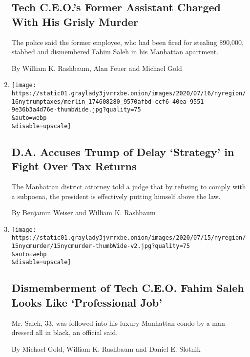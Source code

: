 \begin{enumerate}
{  \subsection{Tech C.E.O.'s Former Assistant Charged With His Grisly
  Murder}\label{tech-ceos-former-assistant-charged-with-his-grisly-murder}}

  The police said the former employee, who had been fired for stealing
  \$90,000, stabbed and dismembered Fahim Saleh in his Manhattan
  apartment.

  By William K. Rashbaum, Alan Feuer and Michael Gold
\item
  \href{/2020/07/16/nyregion/donald-trump-taxes-cyrus-vance.html}{}

  \texttt{[image: https://static01.graylady3jvrrxbe.onion/images/2020/07/16/nyregion/16nytrumptaxes/merlin\_174608280\_9570afbd-ccf6-40ea-9551-9e36b3a4d76e-thumbWide.jpg?quality=75\\\&auto=webp\\\&disable=upscale]}

  \hypertarget{da-accuses-trump-of-delay-strategy-in-fight-over-tax-returns}{%
  \subsection{D.A. Accuses Trump of Delay `Strategy' in Fight Over Tax
  Returns}\label{da-accuses-trump-of-delay-strategy-in-fight-over-tax-returns}}

  The Manhattan district attorney told a judge that by refusing to
  comply with a subpoena, the president is effectively putting himself
  above the law.

  By Benjamin Weiser and William K. Rashbaum
\item
  \href{/2020/07/15/nyregion/fahim-saleh-lower-east-side-murder.html}{}

  \texttt{[image: https://static01.graylady3jvrrxbe.onion/images/2020/07/15/nyregion/15nycmurder/15nycmurder-thumbWide-v2.jpg?quality=75\\\&auto=webp\\\&disable=upscale]}

  \hypertarget{dismemberment-of-tech-ceo-fahim-saleh-looks-like-professional-job}{%
  \subsection{Dismemberment of Tech C.E.O. Fahim Saleh Looks Like
  `Professional
  Job'}\label{dismemberment-of-tech-ceo-fahim-saleh-looks-like-professional-job}}

  Mr. Saleh, 33, was followed into his luxury Manhattan condo by a man
  dressed all in black, an official said.

  By Michael Gold, William K. Rashbaum and Daniel E. Slotnik
\end{enumerate}

